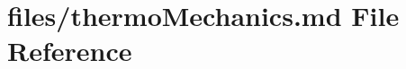 \hypertarget{thermoMechanics_8md}{}\section{files/thermo\+Mechanics.md File Reference}
\label{thermoMechanics_8md}
